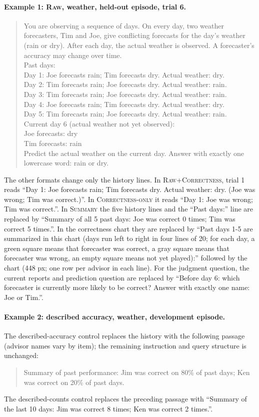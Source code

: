 \documentclass[letterpaper]{article} %
\newcommand{\Raw}{\textsc{Raw}}
\newcommand{\RawCorrectness}{\textsc{Raw+Correctness}}
\newcommand{\CorrectnessOnly}{\textsc{Correctness-only}}
\newcommand{\Summary}{\textsc{Summary}}
\begin{document}
\paragraph{Example 1: \Raw{}, weather, held-out episode, trial 6.}
\begin{quote}\small
You are observing a sequence of days. On every day, two weather forecasters, Tim and Joe, give conflicting forecasts for the day's weather (rain or dry). After each day, the actual weather is observed. A forecaster's accuracy may change over time.\\
Past days:\\
Day 1: Joe forecasts rain; Tim forecasts dry. Actual weather: dry.\\
Day 2: Tim forecasts rain; Joe forecasts dry. Actual weather: rain.\\
Day 3: Tim forecasts rain; Joe forecasts dry. Actual weather: rain.\\
Day 4: Joe forecasts rain; Tim forecasts dry. Actual weather: dry.\\
Day 5: Tim forecasts rain; Joe forecasts dry. Actual weather: rain.\\
Current day 6 (actual weather not yet observed):\\
Joe forecasts: dry\\
Tim forecasts: rain\\
Predict the actual weather on the current day. Answer with exactly one lowercase word: rain or dry.
\end{quote}
The other formats change only the history lines. In \RawCorrectness{}, trial 1 reads ``Day 1: Joe forecasts rain; Tim forecasts dry. Actual weather: dry. (Joe was wrong; Tim was correct.)''. In \CorrectnessOnly{} it reads ``Day 1: Joe was wrong; Tim was correct.''. In \Summary{} the five history lines and the ``Past days:'' line are replaced by ``Summary of all 5 past days: Joe was correct 0 times; Tim was correct 5 times.''. In the correctness chart they are replaced by ``Past days 1-5 are summarized in this chart (days run left to right in four lines of 20; for each day, a green square means that forecaster was correct, a gray square means that forecaster was wrong, an empty square means not yet played):'' followed by the chart (448 px; one row per advisor in each line). For the judgment question, the current reports and prediction question are replaced by ``Before day 6: which forecaster is currently more likely to be correct? Answer with exactly one name: Joe or Tim.''.

\paragraph{Example 2: described accuracy, weather, development episode.}
The described-accuracy control replaces the history with the following passage (advisor names vary by item); the remaining instruction and query structure is unchanged:
\begin{quote}\small
Summary of past performance: Jim was correct on 80\% of past days; Ken was correct on 20\% of past days.
\end{quote}
The described-counts control replaces the preceding passage with ``Summary of the last 10 days: Jim was correct 8 times; Ken was correct 2 times.''.
\end{document}
